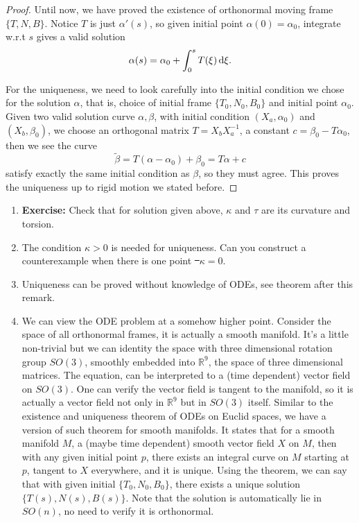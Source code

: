 \begin{proof}
    Until now, we have proved the existence of orthonormal moving frame
    \(\{T,N,B\}\). Notice \(T\) is just \(\alpha'(s)\), so given initial point
    \(\alpha(0)=\alpha_0\), integrate w.r.t \(s\) gives a valid solution \[
        \alpha(s)=\alpha_0+\int_{0}^{s}T(\xi)\dif \xi
    .\]

    For the uniqueness, we need to look carefully into the initial condition we
    chose for the solution \(\alpha\), that is, choice of initial frame
    \(\{T_0,N_0,B_0\}\) and initial point \(\alpha_0\). Given two valid solution
    curve \(\alpha,\beta\), with initial condition \((X_a,\alpha_0)\) and \((X_b,
    \beta_0)\), we choose an orthogonal matrix \(T=X_b X_a^{-1}\), a constant
    \(c=\beta_0-T\alpha_0\), then we see the curve \[
        \tilde{\beta}=T(\alpha-\alpha_0)+\beta_0=T\alpha+c
    \] satisfy exactly the same initial condition as \(\beta\), so they must agree.
    This proves the uniqueness up to rigid motion we stated before.
\end{proof}

\begin{remark}\hfill
\begin{enumerate}[(1)]
    \item \textbf{Exercise:} Check that for solution given above, \(\kappa\) and
        \(\tau\) are its curvature and torsion.
    \item The condition \(\kappa>0\) is needed for uniqueness. Can you construct a
        counterexample when there is one point \st\ \(\kappa=0\).
    \item Uniqueness can be proved without knowledge of ODEs, see theorem after this remark.
    \item We can view the ODE problem at a somehow higher point. Consider the space
        of all orthonormal frames, it is actually a smooth manifold. It's a little
        non-trivial but we can identity the space with three dimensional rotation
        group \(SO(3)\), smoothly embedded into \(\mathbb{R}^9\), the space of
        three dimensional matrices. The equation, can be interpreted to a (time
        dependent) vector field on \(SO(3)\). One can verify the vector field
        is tangent to the manifold, so it is actually a vector field not only in
        \(\mathbb{R}^9\) but in \(SO(3)\) itself. Similar to the existence and
        uniqueness theorem of ODEs on Euclid spaces, we have a version of such
        theorem for smooth manifolds. It states that for a smooth manifold \(M\),
        a (maybe time dependent) smooth vector field \(X\) on \(M\), then with any
        given initial point \(p\), there exists an integral curve on \(M\) starting
        at \(p\), tangent to \(X\) everywhere, and it is unique. Using the theorem,
        we can say that with given initial \(\{T_0,N_0,B_0\}\), there exists a
        unique solution \(\{T(s),N(s),B(s)\}\). Note that the solution is
        automatically lie in \(SO(n)\), no need to verify it is orthonormal.
\end{enumerate}
\end{remark}


